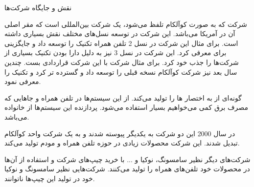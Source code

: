 \Problem
{نقش و جایگاه شرکت‌ها}
{
شرکت
که به صورت کوآلکام تلفظ می‌شود، یک شرکت بین‌المللی است که مقر اصلی آن در آمریکا می‌باشد.
این شرکت در توسعه نسل‌های مختلف نقش بسیاری داشته است.
برای مثال این شرکت در نسل 2 تلفن همراه تکنیک
را توسعه داد و جایگزینی برای
معرقی کرد.
این شرکت در نسل 3 نیز به دلیل دارا بودن تکنیک
بسیاری از شرکت‌ها را جذب خود کرد.
برای مثال شرکت
با این شرکت قراردادی بست.
چندین سال بعد نیز شرکت کوآلکام نسخه قبلی را توسعه داد و گسترده تر کرد و تکنیک
را معرفی نمود.

گونه‌ای از
به اختصار
ها را تولید می‌کند.
از این سیستم‌ها در تلفن همراه و جاهایی که مصرف برق کمی می‌خواهیم بسیار استفاده می‌شود.
پردازنده این سیستم‌ها از خانواده
می‌باشد.

در سال 2000 این دو شرکت به یکدیگر پیوسته شدند و به یک شرکت واحد کوآلکام تبدیل شدند.
این شرکت محصولات زیادی در حوزه تلفن همراه و مودم تولید می‌کند.

شرکت‌های دیگر نظیر سامسونگ، نوکیا و ...
با خرید چیپ‌های شرکت
و استفاده از آن‌ها در محصولات خود تلفن‌های همراه را تولید می‌کنند.
شرکت‌هایی نظیر سامسونگ و نوکیا خود در تولید این چیپ‌ها ناتوانند.
}
